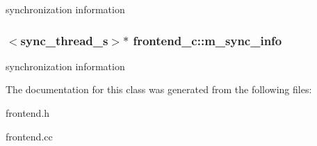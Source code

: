 \label{classfrontend__c_ac593d33a9e55678461f84b74a738fd3b}
synchronization information \hypertarget{classfrontend__c_a0279b18722ea8be3dea43e4c255c8159}{
\subsubsection[{m\_\-sync\_\-info}]{$<${\bf sync\_\-thread\_\-s}$>$$\ast$ {\bf frontend\_\-c::m\_\-sync\_\-info}}}
\label{classfrontend__c_a0279b18722ea8be3dea43e4c255c8159}
synchronization information 

The documentation for this class was generated from the following files:\begin{DoxyCompactItemize}
\item 
frontend.h\item 
frontend.cc\end{DoxyCompactItemize}
